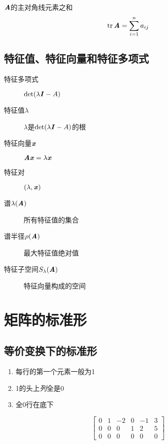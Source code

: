\begin{definition}[迹]
    $\boldsymbol{\mathit{A}}$的主对角线元素之和
    $$
    \mathrm{tr}\, \boldsymbol{\mathit{A}} = \sum_{i=1}^n a_{ij}
    $$
\end{definition}

\subsection{特征值、特征向量和特征多项式}
\label{sub:特征值、特征向量和特征多项式}

\begin{definition}
    \begin{description}
        \item[特征多项式] $\det(\lambda \boldsymbol{\mathit{I}} - A)$
        \item[特征值$\lambda$] $\lambda$是$\det(\lambda \boldsymbol{\mathit{I}} - A)$的根
        \item[特征向量$\boldsymbol{\mathit{x}}$] $\boldsymbol{\mathit{A}} \boldsymbol{\mathit{x}} = \lambda \boldsymbol{\mathit{x}}$
        \item[特征对] $(\lambda, \boldsymbol{\mathit{x}})$
    \end{description}
\end{definition}

\begin{definition}
    \begin{description}
        \item[谱$\lambda(\boldsymbol{\mathit{A}})$] 所有特征值的集合
        \item[谱半径$\rho(\boldsymbol{\mathit{A}})$] 最大特征值绝对值
        \item[特征子空间$S_{\lambda}(\boldsymbol{\mathit{A}})$] 特征向量构成的空间
    \end{description}
\end{definition}

\section{矩阵的标准形}
\label{sec:矩阵的标准形}

\subsection{等价变换下的标准形}
\label{sub:等价变换下的标准形}

\begin{definition}[行阶梯矩阵]
    \begin{enumerate}
        \item 每行的第一个元素一般为1
        \item 1的头上\emph{列}全是0
        \item 全0行在底下
    \end{enumerate}

    \[
        \begin{bmatrix}
            0   &   1   &   -2  &   0   &   -1  &   3   \\
            0   &   0   &   0   &   1   &   2   &   5   \\
            0   &   0   &   0   &   0   &   0   &   0
        \end{bmatrix}
    \]
\end{definition}

